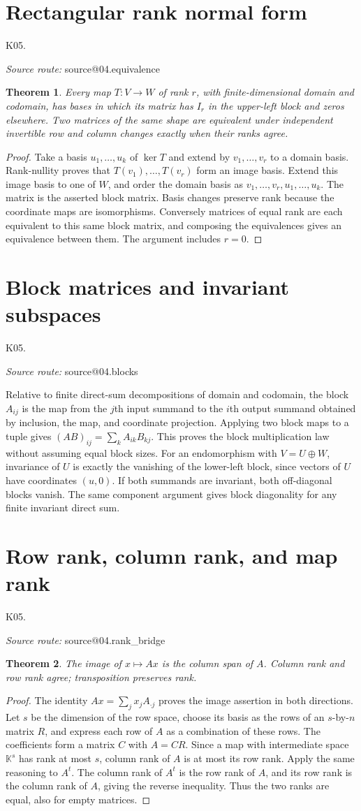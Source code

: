 \documentclass[11pt,a4paper]{book}
\makeatletter
\newtheorem{theorem}{Theorem}[chapter]
\theoremstyle{definition}\newtheorem{definition}[theorem]{Definition}
\theoremstyle{remark}\newtheorem{remark}[theorem]{Remark}
\newcommand{\K}{\mathbb K}\newcommand{\R}{\mathbb R}\newcommand{\C}{\mathbb C}
\newcommand{\Kentry}[2]{\section{#2}\label{k:#1}\noindent\textsf{\small K05.\detokenize{#1}}\par
  \begingroup\small\color{black!65}\textit{Source route: }\csname source@#1\endcsname\par\endgroup}
\makeatother
\begin{document}
\Kentry{04.equivalence}{Rectangular rank normal form}
\begin{theorem}
Every map $T:V\to W$ of rank $r$, with finite-dimensional domain and codomain, has bases in which its matrix has $I_r$ in the upper-left block and zeros elsewhere. Two matrices of the same shape are equivalent under independent invertible row and column changes exactly when their ranks agree.
\end{theorem}
\begin{proof}
Take a basis $u_1,\ldots,u_k$ of $\ker T$ and extend by $v_1,\ldots,v_r$ to a domain basis. Rank-nullity proves that $T(v_1),\ldots,T(v_r)$ form an image basis. Extend this image basis to one of $W$, and order the domain basis as $v_1,\ldots,v_r,u_1,\ldots,u_k$. The matrix is the asserted block matrix. Basis changes preserve rank because the coordinate maps are isomorphisms. Conversely matrices of equal rank are each equivalent to this same block matrix, and composing the equivalences gives an equivalence between them. The argument includes $r=0$.
\end{proof}

\Kentry{04.blocks}{Block matrices and invariant subspaces}
Relative to finite direct-sum decompositions of domain and codomain, the block $A_{ij}$ is the map from the $j$th input summand to the $i$th output summand obtained by inclusion, the map, and coordinate projection. Applying two block maps to a tuple gives $(AB)_{ij}=\sum_kA_{ik}B_{kj}$. This proves the block multiplication law without assuming equal block sizes. For an endomorphism with $V=U\oplus W$, invariance of $U$ is exactly the vanishing of the lower-left block, since vectors of $U$ have coordinates $(u,0)$. If both summands are invariant, both off-diagonal blocks vanish. The same component argument gives block diagonality for any finite invariant direct sum.

\Kentry{04.rank_bridge}{Row rank, column rank, and map rank}
\begin{theorem}
The image of $x\mapsto Ax$ is the column span of $A$. Column rank and row rank agree; transposition preserves rank.
\end{theorem}
\begin{proof}
The identity $Ax=\sum_jx_jA_{\cdot j}$ proves the image assertion in both directions. Let $s$ be the dimension of the row space, choose its basis as the rows of an $s$-by-$n$ matrix $R$, and express each row of $A$ as a combination of these rows. The coefficients form a matrix $C$ with $A=CR$. Since a map with intermediate space $\K^s$ has rank at most $s$, column rank of $A$ is at most its row rank. Apply the same reasoning to $A^t$. The column rank of $A^t$ is the row rank of $A$, and its row rank is the column rank of $A$, giving the reverse inequality. Thus the two ranks are equal, also for empty matrices.
\end{proof}
\end{document}
